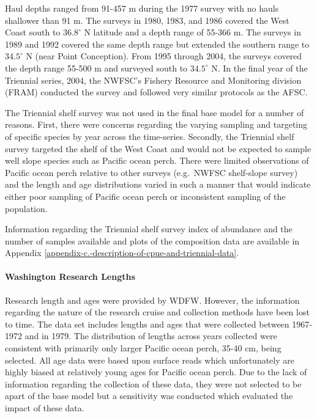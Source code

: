 \documentclass[12pt,]{article}
\let\oldparagraph\paragraph
\renewcommand{\paragraph}[1]{\oldparagraph{#1}\mbox{}}
\begin{document}
Haul depths ranged from 91-457 m during the 1977 survey with no hauls
shallower than 91 m. The surveys in 1980, 1983, and 1986 covered the
West Coast south to \(36.8^\circ\) N latitude and a depth range of
55-366 m. The surveys in 1989 and 1992 covered the same depth range but
extended the southern range to \(34.5^\circ\) N (near Point Conception).
From 1995 through 2004, the surveys covered the depth range 55-500 m and
surveyed south to \(34.5^\circ\) N. In the final year of the Triennial
series, 2004, the NWFSC's Fishery Resource and Monitoring division
(FRAM) conducted the survey and followed very similar protocols as the
AFSC.

The Triennial shelf survey was not used in the final base model for a
number of reasons. First, there were concerns regarding the varying
sampling and targeting of specific species by year across the
time-series. Secondly, the Triennial shelf survey targeted the shelf of
the West Coast and would not be expected to sample well slope species
such as Pacific ocean perch. There were limited observations of Pacific
ocean perch relative to other surveys (e.g.~NWFSC shelf-slope survey)
and the length and age distributions varied in such a manner that would
indicate either poor sampling of Pacific ocean perch or inconsistent
sampling of the population.

Information regarding the Triennial shelf survey index of abundance and
the number of samples available and plots of the composition data are
available in Appendix
\ref{appendix-c.-description-of-cpue-and-triennial-data}.

\paragraph{Washington Research
Lengths}\label{washington-research-lengths}

Research length and ages were provided by WDFW. However, the information
regarding the nature of the research cruise and collection methods have
been lost to time. The data set includes lengths and ages that were
collected between 1967-1972 and in 1979. The distribution of lengths
across years collected were consistent with primarily only larger
Pacific ocean perch, 35-40 cm, being selected. All age data were based
upon surface reads which unfortunately are highly biased at relatively
young ages for Pacific ocean perch. Due to the lack of information
regarding the collection of these data, they were not selected to be
apart of the base model but a sensitivity was conducted which evaluated
the impact of these data.
\end{document}
